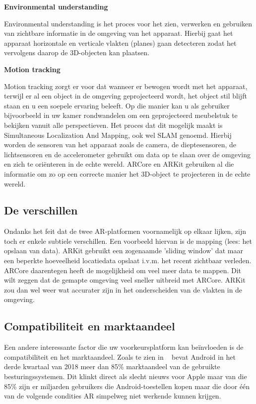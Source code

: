 \textbf{Environmental understanding}

Environmental understanding is het proces voor het zien, verwerken en gebruiken van zichtbare informatie in de omgeving van het apparaat. Hierbij gaat het apparaat horizontale en verticale vlakten (planes) gaan detecteren zodat het vervolgens daarop de 3D-objecten kan plaatsen.

\textbf{Motion tracking}

Motion tracking zorgt er voor dat wanneer er bewogen wordt met het apparaat, terwijl er al een object in de omgeving geprojecteerd wordt, het object stil blijft staan en u een soepele ervaring beleeft. Op die manier kan u als gebruiker bijvoorbeeld in uw kamer rondwandelen om een geprojecteerd meubelstuk te bekijken vanuit alle perspectieven. Het proces dat dit mogelijk maakt is Simultaneous Localization And Mapping, ook wel SLAM genoemd. Hierbij worden de sensoren van het apparaat zoals de camera, de dieptesensoren, de lichtsensoren en de accelerometer gebruikt om data op te slaan over de omgeving en zich te oriënteren in de echte wereld. ARCore en ARKit gebruiken al die informatie om zo op een correcte manier het 3D-object te projecteren in de echte wereld. 

\subsection{De verschillen}

Ondanks het feit dat de twee AR-platformen voornamelijk op elkaar lijken, zijn toch er enkele subtiele verschillen. Een voorbeeld hiervan is de mapping (lees: het opslaan van data). ARKit gebruikt een zogenaamde 'sliding window' dat maar een beperkte hoeveelheid locatiedata opslaat i.v.m. het recent zichtbaar verleden. ARCore daarentegen heeft de mogelijkheid om veel meer data te mappen. Dit wilt zeggen dat de gemapte omgeving veel sneller uitbreid met ARCore. ARKit zou dan wel weer wat accurater zijn in het onderscheiden van de vlakten in de omgeving. 

\subsection{Compatibiliteit en marktaandeel}

Een andere interessante factor die uw voorkeursplatform kan beïnvloeden is de compatibiliteit en het marktaandeel. Zoals te zien in ~\textcite{IDC2018} bevat Android in het derde kwartaal van 2018 meer dan 85\% marktaandeel van de gebruikte besturingssystemen. Dit klinkt direct als slecht nieuws voor Apple maar van die 85\% zijn er miljarden gebruikers die Android-toestellen kopen maar die door één van de volgende condities AR simpelweg niet werkende kunnen krijgen. 

